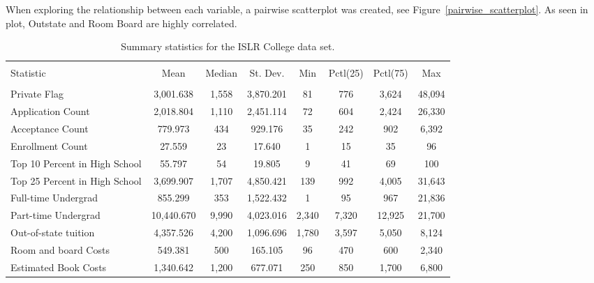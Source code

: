 \documentclass{article}\usepackage[]{graphicx}\usepackage[]{color}
\begin{document}
When exploring the relationship between each variable, a pairwise scatterplot was created, see Figure~\ref{pairwise_scatterplot}. As seen in plot, Outstate and Room Board are highly correlated.



\begin{table} \centering 
  \caption{Summary statistics for the ISLR College data set.} 
  \label{descrips} 
\begin{tabular}{@{\extracolsep{5pt}}lccccccc} 
\\[-1.8ex]\hline 
\hline \\[-1.8ex] 
Statistic & \multicolumn{1}{c}{Mean} & \multicolumn{1}{c}{Median} & \multicolumn{1}{c}{St. Dev.} & \multicolumn{1}{c}{Min} & \multicolumn{1}{c}{Pctl(25)} & \multicolumn{1}{c}{Pctl(75)} & \multicolumn{1}{c}{Max} \\ 
\hline \\[-1.8ex] 
Private Flag & 3,001.638 & 1,558 & 3,870.201 & 81 & 776 & 3,624 & 48,094 \\ 
Application Count & 2,018.804 & 1,110 & 2,451.114 & 72 & 604 & 2,424 & 26,330 \\ 
Acceptance Count & 779.973 & 434 & 929.176 & 35 & 242 & 902 & 6,392 \\ 
Enrollment Count & 27.559 & 23 & 17.640 & 1 & 15 & 35 & 96 \\ 
Top 10 Percent in High School & 55.797 & 54 & 19.805 & 9 & 41 & 69 & 100 \\ 
Top 25 Percent in High School & 3,699.907 & 1,707 & 4,850.421 & 139 & 992 & 4,005 & 31,643 \\ 
Full-time Undergrad & 855.299 & 353 & 1,522.432 & 1 & 95 & 967 & 21,836 \\ 
Part-time Undergrad & 10,440.670 & 9,990 & 4,023.016 & 2,340 & 7,320 & 12,925 & 21,700 \\ 
Out-of-state tuition & 4,357.526 & 4,200 & 1,096.696 & 1,780 & 3,597 & 5,050 & 8,124 \\ 
Room and board Costs & 549.381 & 500 & 165.105 & 96 & 470 & 600 & 2,340 \\ 
Estimated Book Costs & 1,340.642 & 1,200 & 677.071 & 250 & 850 & 1,700 & 6,800 \\ 

\end{tabular}
\end{table}
\end{document}
